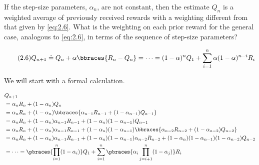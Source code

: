 
\begin{exercise}[Exercise 2.4]

If the step-size parameters, $\alpha_n$, are not constant, then the estimate $Q_n$ is a weighted average of previously received rewards with a weighting different from that given by \eqref{eq:2.6}.
What is the weighting on each prior reward for the general case, analogous to \eqref{eq:2.6}, in terms of the sequence of step-size parameters?

\end{exercise}


\begin{solution}

\begin{align} \label{eq:2.6} \tag{2.6}
    Q_{n+1}
    \doteq
    Q_n + \alpha \bbraces{R_n - Q_n}
    = \cdots =
    (1 - \alpha)^n Q_1
    +
    \sum_{i=1}^n
        \alpha (1 - \alpha)^{n-i} R_i
\end{align}
    
We will start with a formal calculation.

\begin{align*}
    &
    Q_{n+1} \\
    & =
    \alpha_n R_n + (1 - \alpha_n) Q_n \\
    & =
    \alpha_n R_n + (1 - \alpha_n) \bbraces{\alpha_{n-1} R_{n-1} + (1 - \alpha_{n-1}) Q_{n-1}} \\
    & =
    \alpha_n R_n + (1 - \alpha_n) \alpha_{n-1} R_{n-1} + (1 - \alpha_n) (1 - \alpha_{n-1}) Q_{n-1} \\
    & =
    \alpha_n R_n + (1 - \alpha_n) \alpha_{n-1} R_{n-1} + (1 - \alpha_n) (1 - \alpha_{n-1}) \bbraces{\alpha_{n-2} R_{n-2} + (1 - \alpha_{n-2}) Q_{n-2}} \\
    & =
    \alpha_n R_n + (1 - \alpha_n) \alpha_{n-1} R_{n-1} + (1 - \alpha_n) (1 - \alpha_{n-1}) \alpha_{n-2} R_{n-2} + (1 - \alpha_n) (1 - \alpha_{n-1}) (1 - \alpha_{n-2}) Q_{n-2} \\
    & = \cdots =
    \pbraces
    {
        \prod_{i=1}^n
            (1 - \alpha_i)
    }
    Q_1
    +
    \sum_{i=1}^n
        \pbraces
        {
            \alpha_i
            \prod_{j=i+1}^n
                (1 - \alpha_j)
        }
        R_i
\end{align*}


\end{solution}

